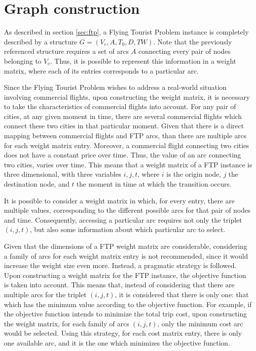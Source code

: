 \section{Graph construction}
\label{sec:ftp_graph}



As described in section \ref{sec:ftp}, a Flying Tourist Problem instance is completely described by a structure 
$G =(V_c, A, T_{0}, D, TW)$. Note that the previously referenced structure requires a set of arcs $A$ connecting every pair of nodes belonging to $V_c$. Thus, it is possible to represent this information in a weight matrix, where each of its entries corresponds to a particular arc.

Since the Flying Tourist Problem wishes to address a real-world situation involving commercial flights, upon constructing the weight matrix, it is necessary to take the characteristics of commercial flights into account. For any pair of cities, at any given moment in time, there are several commercial flights which connect these two cities in that particular moment. Given that there is a direct mapping between commercial flights and FTP arcs, than there are multiple arcs for each weight matrix entry. Moreover, a commercial flight connecting two cities does not have a constant price over time. Thus, the value of an arc connecting two cities, varies over time. This means that a weight matrix of a FTP instance is three dimensional, with three variables $i, j, t$, where $i$ is the origin node, $j$ the destination node, and $t$ the moment in time at which the transition occurs.

It is possible to consider a weight matrix in which, for every entry, there are multiple values, corresponding to the different possible arcs for that pair of nodes and time. Consequently, accessing a particular arc requires not only the triplet $(i, j, t)$, but also some information about which particular arc to select. 

Given that the dimensions of a FTP weight matrix are considerable, considering a family of arcs for each weight matrix entry is not recommended, since it would increase the weight size even more. Instead, a pragmatic strategy is followed. Upon constructing a weight matrix for the FTP instance, the objective function is taken into account. This means that, instead of considering that there are multiple arcs for the triplet $(i, j, t)$, it is considered that there is only one: that which has the minimum value according to the objective function. For example, if the objective function intends to minimize the total trip cost, upon constructing the weight matrix, for each family of arcs $(i, j, t)$, only the minimum cost arc would be selected. Using this strategy, for each cost matrix entry, there is only one available arc, and it is the one which minimizes the objective function.

